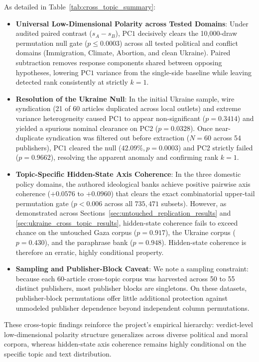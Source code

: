 As detailed in Table~\ref{tab:cross_topic_summary}:
\begin{itemize}
    \item \textbf{Universal Low-Dimensional Polarity across Tested Domains}: Under audited paired contrast ($s_A - s_B$), $\mathrm{PC1}$ decisively clears the 10,000-draw permutation null gate ($p \le 0.0003$) across all tested political and conflict domains (Immigration, Climate, Abortion, and clean Ukraine). Paired subtraction removes response components shared between opposing hypotheses, lowering $\mathrm{PC1}$ variance from the single-side baseline while leaving detected rank consistently at strictly $k = 1$.
    \item \textbf{Resolution of the Ukraine Null}: In the initial Ukraine sample, wire syndication (21 of 60 articles duplicated across local outlets) and extreme variance heterogeneity caused $\mathrm{PC1}$ to appear non-significant ($p = 0.3414$) and yielded a spurious nominal clearance on $\mathrm{PC2}$ ($p = 0.0328$). Once near-duplicate syndication was filtered out before extraction ($N=60$ across 54 publishers), $\mathrm{PC1}$ cleared the null ($42.09\%, p = 0.0003$) and $\mathrm{PC2}$ strictly failed ($p = 0.9662$), resolving the apparent anomaly and confirming rank $k=1$.
    \item \textbf{Topic-Specific Hidden-State Axis Coherence}: In the three domestic policy domains, the authored ideological banks achieve positive pairwise axis coherence ($+0.0576$ to $+0.0960$) that clears the exact combinatorial upper-tail permutation gate ($p < 0.006$ across all $735{,}471$ subsets). However, as demonstrated across Sections~\ref{sec:untouched_replication_results} and \ref{sec:ukraine_cross_topic_results}, hidden-state coherence fails to exceed chance on the untouched Gaza corpus ($p = 0.917$), the Ukraine corpus ($p = 0.430$), and the paraphrase bank ($p = 0.948$). Hidden-state coherence is therefore an erratic, highly conditional property.
    \item \textbf{Sampling and Publisher-Block Caveat}: We note a sampling constraint: because each 60-article cross-topic corpus was harvested across 50 to 55 distinct publishers, most publisher blocks are singletons. On these datasets, publisher-block permutations offer little additional protection against unmodeled publisher dependence beyond independent column permutations.
\end{itemize}
These cross-topic findings reinforce the project's empirical hierarchy: verdict-level low-dimensional polarity structure generalizes across diverse political and moral corpora, whereas hidden-state axis coherence remains highly conditional on the specific topic and text distribution.



